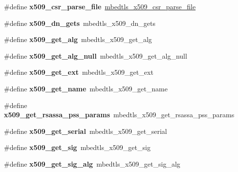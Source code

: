 \begin{DoxyCompactItemize}
\mbox{\label{compat-1_83_8h_aa565e064da1d25908170bce64e856391}} 
\#define {\bfseries x509\+\_\+csr\+\_\+parse\+\_\+file}~\mbox{\hyperlink{group__x509__module_gaf49db7323eee45d9649600de18d715f8}{mbedtls\+\_\+x509\+\_\+csr\+\_\+parse\+\_\+file}}
\item 
\mbox{\label{compat-1_83_8h_a7e76871d8c79fadbfc5ad0a10498f091}} 
\#define {\bfseries x509\+\_\+dn\+\_\+gets}~mbedtls\+\_\+x509\+\_\+dn\+\_\+gets
\item 
\mbox{\label{compat-1_83_8h_ac7eafb3788a5f4533931a305b37c2913}} 
\#define {\bfseries x509\+\_\+get\+\_\+alg}~mbedtls\+\_\+x509\+\_\+get\+\_\+alg
\item 
\mbox{\label{compat-1_83_8h_a988212811f7aaae5e15f3b303201572f}} 
\#define {\bfseries x509\+\_\+get\+\_\+alg\+\_\+null}~mbedtls\+\_\+x509\+\_\+get\+\_\+alg\+\_\+null
\item 
\mbox{\label{compat-1_83_8h_a8160289581a9ab2bd8b6af3966676ff2}} 
\#define {\bfseries x509\+\_\+get\+\_\+ext}~mbedtls\+\_\+x509\+\_\+get\+\_\+ext
\item 
\mbox{\label{compat-1_83_8h_a996ce2a682b0f7e6e76e953bee47470c}} 
\#define {\bfseries x509\+\_\+get\+\_\+name}~mbedtls\+\_\+x509\+\_\+get\+\_\+name
\item 
\mbox{\label{compat-1_83_8h_acfa88e7e8015034d79e16b9b940e4634}} 
\#define {\bfseries x509\+\_\+get\+\_\+rsassa\+\_\+pss\+\_\+params}~mbedtls\+\_\+x509\+\_\+get\+\_\+rsassa\+\_\+pss\+\_\+params
\item 
\mbox{\label{compat-1_83_8h_adda3ad994d9d311903524d777c44c93f}} 
\#define {\bfseries x509\+\_\+get\+\_\+serial}~mbedtls\+\_\+x509\+\_\+get\+\_\+serial
\item 
\mbox{\label{compat-1_83_8h_a9821ad162d9337ad1591910592a180b2}} 
\#define {\bfseries x509\+\_\+get\+\_\+sig}~mbedtls\+\_\+x509\+\_\+get\+\_\+sig
\item 
\mbox{\label{compat-1_83_8h_a510cd159e825e724613a6d24a8c54d0a}} 
\#define {\bfseries x509\+\_\+get\+\_\+sig\+\_\+alg}~mbedtls\+\_\+x509\+\_\+get\+\_\+sig\+\_\+alg

\end{DoxyCompactItemize}
